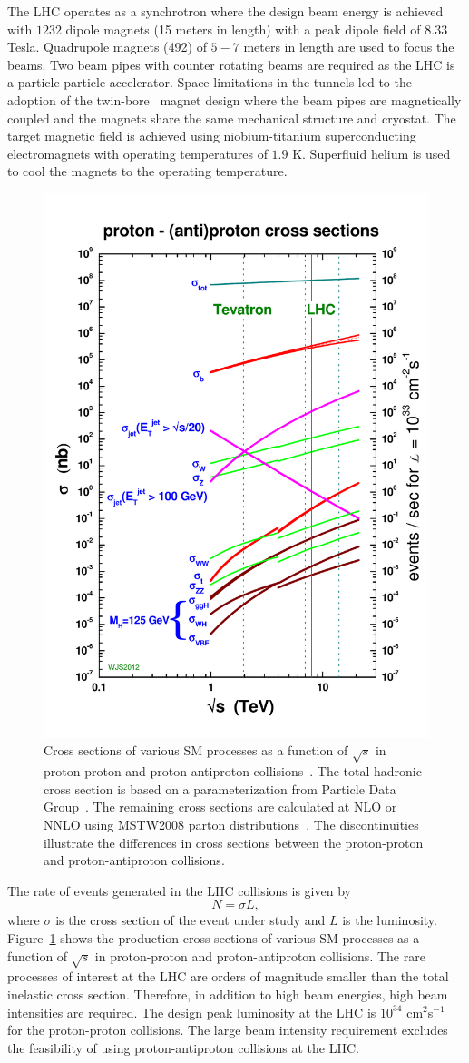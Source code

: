 The LHC operates as a synchrotron where the design beam energy is achieved with $1232$ dipole magnets (15 meters in length) with a peak dipole field of $8.33$ Tesla. Quadrupole magnets (492) of $5-7$ meters in length are used to focus the beams. Two beam pipes with counter rotating beams are required as the LHC is a particle-particle accelerator.  Space limitations in the tunnels led to the adoption of the twin-bore~\cite{Blewett:1971zzb} magnet design where the beam pipes are magnetically coupled and the magnets share the same mechanical structure and cryostat. The target magnetic field is achieved using niobium-titanium superconducting electromagnets with operating temperatures of $1.9$ K. Superfluid helium is used to cool the magnets to the operating temperature.
\begin{figure}[h]
\centering
\includegraphics[width=0.5\columnwidth]{figures_chapter2/crosssections2013}
\caption{Cross sections of various SM processes as a function of $\sqrt{s}$ in proton-proton and proton-antiproton collisions~\cite{sterling}. The total hadronic cross section is based on a parameterization from Particle Data Group~\cite{Agashe:2014kda}. The remaining cross sections are calculated at NLO or NNLO using MSTW2008 parton distributions~\cite{MSTW}. The discontinuities illustrate the differences in cross sections between the proton-proton and proton-antiproton collisions.}
\label{fig:xsec}
\end{figure}
The rate of events generated in the LHC collisions is given by 
\begin{equation} \label{eq:lumi}
N = \sigma L,
\end{equation}
where $\sigma$ is the cross section of the event under study and $L$ is the luminosity. \newline Figure~\ref{fig:xsec} shows the production cross sections of various SM processes as a function of $\sqrt{s}$ in proton-proton and proton-antiproton collisions. The rare processes of interest at the LHC are orders of magnitude smaller than the total inelastic cross section. Therefore, in addition to high beam energies, high beam intensities are required. The design peak luminosity at the LHC is $10^{34}$ cm$^2$s$^{-1}$ for the proton-proton collisions. The large beam intensity requirement excludes the feasibility of using proton-antiproton collisions at the LHC. 

